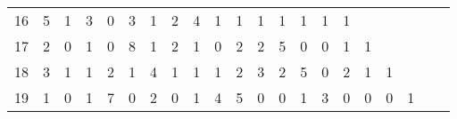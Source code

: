 \begin{table}
\begin{tabular}{lp{0.7cm}p{0.7cm}p{0.7cm}p{0.7cm}p{0.7cm}p{0.7cm}p{0.7cm}p{0.7cm}p{0.7cm}p{0.7cm}p{0.7cm}p{0.7cm}p{0.7cm}p{0.7cm}p{0.7cm}p{0.7cm}p{0.7cm}p{0.7cm}p{0.7cm}p{0.7cm}}
16 &   5 &   1 &   3 &   0 &   3 &   1 &   2 &   4 &   1 &   1 &   1 &   1 &   1 &   1 &   1 &     &     &     \\
17 &   2 &   0 &   1 &   0 &   8 &   1 &   2 &   1 &   0 &   2 &   2 &   5 &   0 &   0 &   1 &   1 &     &     \\
18 &   3 &   1 &   1 &   2 &   1 &   4 &   1 &   1 &   1 &   2 &   3 &   2 &   5 &   0 &   2 &   1 &   1 &     \\
19 &   1 &   0 &   1 &   7 &   0 &   2 &   0 &   1 &   4 &   5 &   0 &   0 &   1 &   3 &   0 &   0 &   0 &   1 \\
\bottomrule
\end{tabular}
\end{table}
